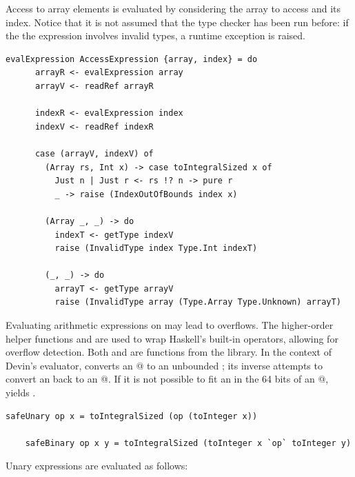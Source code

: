 \documentclass[UdineBachThesis,american,11pt]{PhdThesis}
\begin{document}
  Access to array elements is evaluated by considering the array to access and
  its index. Notice that it is not assumed that the type checker has been run
  before: if the the expression involves invalid types, a runtime exception is
  raised.

  \begin{lstlisting}[gobble=4,basicstyle=\ttfamily\small]
    evalExpression AccessExpression {array, index} = do
      arrayR <- evalExpression array
      arrayV <- readRef arrayR

      indexR <- evalExpression index
      indexV <- readRef indexR

      case (arrayV, indexV) of
        (Array rs, Int x) -> case toIntegralSized x of
          Just n | Just r <- rs !? n -> pure r
          _ -> raise (IndexOutOfBounds index x)

        (Array _, _) -> do
          indexT <- getType indexV
          raise (InvalidType index Type.Int indexT)

        (_, _) -> do
          arrayT <- getType arrayV
          raise (InvalidType array (Type.Array Type.Unknown) arrayT)
  \end{lstlisting}

  Evaluating arithmetic expressions on \lstinline@Int@s may lead to overflows.
  The higher-order helper functions \lstinline@safeUnary@ and
  \lstinline@safeBinary@ are used to wrap Haskell's built-in operators, allowing
  for overflow detection. Both \lstinline@toInteger@ and
  \lstinline@toIntegralSized@ are functions from the \lstinline@base@ library.
  In the context of Devin's evaluator, \lstinline@toInteger@ converts an
  @ to an unbounded \lstinline@Integer@; its inverse
  \lstinline@toIntegralSized@ attempts to convert an \lstinline@Integer@ back to
  an @. If it is not possible to fit an \lstinline@Integer@ in
  the 64 bits of an @, \lstinline@toIntegralSized@ yields
  \lstinline@Nothing@.

  \begin{lstlisting}[gobble=4,basicstyle=\ttfamily\small]
    safeUnary op x = toIntegralSized (op (toInteger x))

    safeBinary op x y = toIntegralSized (toInteger x `op` toInteger y)
  \end{lstlisting}

  Unary expressions are evaluated as follows:
\end{document}
